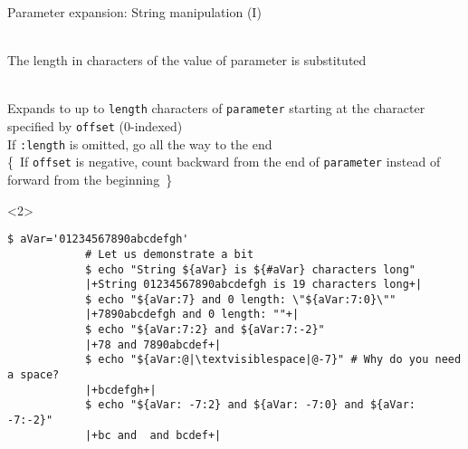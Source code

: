 \begin{frame}[fragile]{Parameter expansion: String manipulation (I)}
    \vspace{-3mm}
    \begin{description}
        \item[String Length:] \\
            {\small
                The length in characters of the value of parameter is substituted
            }
        \item[Substring Expansion:] \\
            {\small
                Expands to up to \texttt{length} characters of \texttt{parameter}
                starting at the character specified by \texttt{offset} (0-indexed)\\
                If \texttt{:length} is omitted, go all the way to the end\\[-0.5em]
                {\tiny\{~If \texttt{offset} is negative, count backward from the end
                of \texttt{parameter} instead of forward from the beginning~\}}
            }
    \end{description}
    \begin{uncoverenv}<2>
        \begin{lstlisting}[style=MyBash, style=oddnumbers, aboveskip=2mm]
            $ aVar='01234567890abcdefgh'
            # Let us demonstrate a bit
            $ echo "String ${aVar} is ${#aVar} characters long"
            |+String 01234567890abcdefgh is 19 characters long+|
            $ echo "${aVar:7} and 0 length: \"${aVar:7:0}\""
            |+7890abcdefgh and 0 length: ""+|
            $ echo "${aVar:7:2} and ${aVar:7:-2}"
            |+78 and 7890abcdef+|
            $ echo "${aVar:@|\textvisiblespace|@-7}" # Why do you need a space?
            |+bcdefgh+|
            $ echo "${aVar: -7:2} and ${aVar: -7:0} and ${aVar: -7:-2}"
            |+bc and  and bcdef+|
        \end{lstlisting}
    \end{uncoverenv}
\end{frame}

